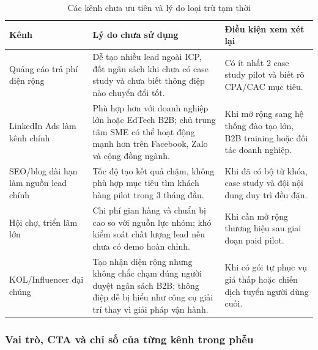 \begin{table}[H]
    \centering
    \small
    \setlength{\tabcolsep}{4pt}
    \renewcommand{\arraystretch}{1.22}
    \caption{Các kênh chưa ưu tiên và lý do loại trừ tạm thời}
    \label{tab:channels-not-prioritized-1stream}
    \begin{tabularx}{\linewidth}{@{}L{3.4cm}Y L{3.1cm}@{}}
        \toprule
        \textbf{Kênh} & \textbf{Lý do chưa sử dụng} & \textbf{Điều kiện xem xét lại} \\ \midrule

        Quảng cáo trả phí diện rộng &
        Dễ tạo nhiều lead ngoài ICP, đốt ngân sách khi chưa có case study và chưa
        biết thông điệp nào chuyển đổi tốt. &
        Có ít nhất 2 case study pilot và biết rõ CPA/CAC mục tiêu. \\

        LinkedIn Ads làm kênh chính &
        Phù hợp hơn với doanh nghiệp lớn hoặc EdTech B2B; chủ trung tâm SME có thể
        hoạt động mạnh hơn trên Facebook, Zalo và cộng đồng ngành. &
        Khi mở rộng sang hệ thống đào tạo lớn, B2B training hoặc đối tác doanh
        nghiệp. \\

        SEO/blog dài hạn làm nguồn lead chính &
        Tốc độ tạo kết quả chậm, không phù hợp mục tiêu tìm khách hàng pilot trong
        3 tháng đầu. &
        Khi đã có bộ từ khóa, case study và đội nội dung duy trì đều đặn. \\

        Hội chợ, triển lãm lớn &
        Chi phí gian hàng và chuẩn bị cao so với nguồn lực nhóm; khó kiểm soát
        chất lượng lead nếu chưa có demo hoàn chỉnh. &
        Khi cần mở rộng thương hiệu sau giai đoạn paid pilot. \\

        KOL/Influencer đại chúng &
        Tạo nhận diện rộng nhưng không chắc chạm đúng người duyệt ngân sách B2B;
        thông điệp dễ bị hiểu như công cụ giải trí thay vì giải pháp vận hành. &
        Khi có gói tự phục vụ giá thấp hoặc chiến dịch tuyển người dùng cuối. \\ \bottomrule
    \end{tabularx}
\end{table}

\subsubsection{Vai trò, CTA và chỉ số của từng kênh trong phễu}

